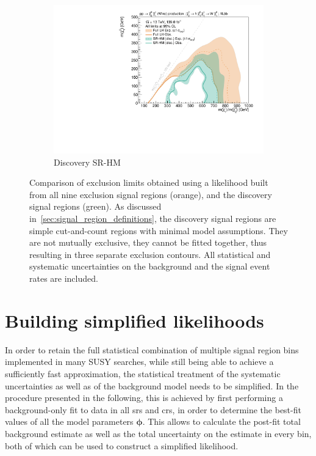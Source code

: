 \begin{figure}
\begin{subfigure}[b]{0.5\textwidth}
		\centering\includegraphics[width=\textwidth]{exclusion_1Lbb_SRHM_noLabel}
		\caption{Discovery SR-HM\label{fig:single_bin_SRHM}}
	\end{subfigure}%
	\caption{Comparison of exclusion limits obtained using a likelihood built from all nine exclusion signal regions (orange), and the discovery signal regions (green). As discussed in~\cref{sec:signal_region_definitions}, the discovery signal regions are simple cut-and-count regions with minimal model assumptions. They are not mutually exclusive, they cannot be fitted together, thus resulting in three separate exclusion contours. All statistical and systematic uncertainties on the background and the signal event rates are included.}\label{fig:single_bin}
\end{figure}

\section{Building simplified likelihoods}\label{sec:building_simplified_likelihoods}



In order to retain the full statistical combination of multiple signal region bins implemented in many SUSY searches, while still being able to achieve a sufficiently fast approximation, the statistical treatment of the systematic uncertainties as well as of the background model needs to be simplified. In the procedure presented in the following, this is achieved by first performing a background-only fit to data in all \glspl{sr} and \glspl{cr}, in order to determine the best-fit values of all the model parameters $\boldsymbol{\phi}$. This allows to calculate the post-fit total background estimate as well as the total uncertainty on the estimate in every bin, both of which can be used to construct a simplified likelihood.

